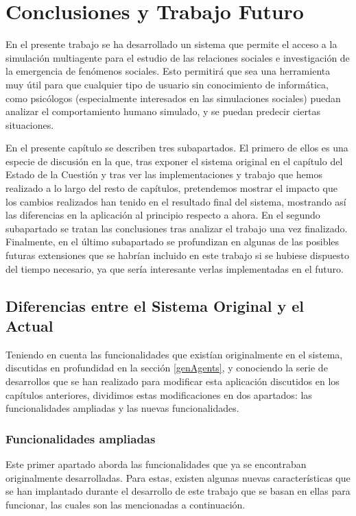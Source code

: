 \chapter{Conclusiones y Trabajo Futuro}
\label{cap:conclusiones}

En el presente trabajo se ha desarrollado un sistema que permite el acceso a la simulación multiagente para el estudio de las relaciones sociales e investigación de la emergencia de fenómenos sociales. Esto permitirá que sea una herramienta muy útil para que cualquier tipo de usuario sin conocimiento de informática, como psicólogos (especialmente interesados en las simulaciones sociales) puedan analizar el comportamiento humano simulado, y se puedan predecir ciertas situaciones.

En el presente capítulo se describen tres subapartados. El primero de ellos es una especie de discusión en la que, tras exponer el sistema original en el capítulo del Estado de la Cuestión y tras ver las implementaciones y trabajo que hemos realizado a lo largo del resto de capítulos, pretendemos mostrar el impacto que los cambios realizados han tenido en el resultado final del sistema, mostrando así las diferencias en la aplicación al principio respecto a ahora. En el segundo subapartado se tratan las conclusiones tras analizar el trabajo una vez finalizado. Finalmente, en el último subapartado se profundizan en algunas de las posibles futuras extensiones que se habrían incluido en este trabajo si se hubiese dispuesto del tiempo necesario, ya que sería interesante verlas implementadas en el futuro.

\section{Diferencias entre el Sistema Original y el Actual}

Teniendo en cuenta las funcionalidades que existían originalmente en el sistema, discutidas en profundidad en la sección \ref{genAgents}, y conociendo la serie de desarrollos que se han realizado para modificar esta aplicación discutidos en los capítulos anteriores, dividimos estas modificaciones en dos apartados: las funcionalidades ampliadas y las nuevas funcionalidades.

\subsection{Funcionalidades ampliadas}
Este primer apartado aborda las funcionalidades que ya se encontraban originalmente desarrolladas. Para estas, existen algunas nuevas características que se han implantado durante el desarrollo de este trabajo que se basan en ellas para funcionar, las cuales son las mencionadas a continuación.

